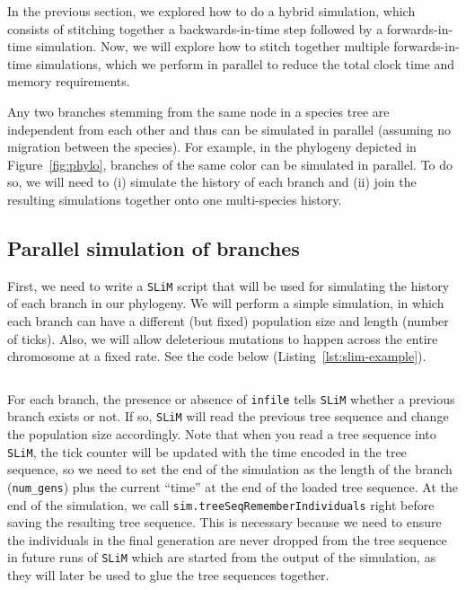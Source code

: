 \documentclass[12pt]{article}
\newcommand{\slim}[0]{\texttt{SLiM}\xspace}
\begin{document}
In the previous section, we explored how to do a hybrid simulation, which consists of stitching together a backwards-in-time step followed by a forwards-in-time simulation.
Now, we will explore how to stitch together multiple forwards-in-time simulations, which we perform in parallel to reduce the total clock time and memory requirements.

Any two branches stemming from the same node in a species tree are independent from each other and
thus can be simulated in parallel (assuming no migration between the species).
For example, in the phylogeny depicted in Figure~\ref{fig:phylo},
branches of the same color can be simulated in parallel.
To do so, we will need to
(i) simulate the history of each branch and
(ii) join the resulting simulations together onto one multi-species history.

\subsection{Parallel simulation of branches}

First, we need to write a \slim script that will be used for simulating the history of each branch in our phylogeny.
We will perform a simple simulation,
in which each branch can have a different (but fixed) population size and length (number of ticks).
Also, we will allow deleterious mutations to happen across the entire chromosome at a fixed rate.
See the code below (Listing~\ref{lst:slim-example}).

\begin{listing}[H]
  \inputminted[breaklines, breakautoindent=true, breakanywhere=true, fontsize=\small, linenos, bgcolor=gray!10]{javascript}{./code/parallelizing_phylogeny/simulate_branch.slim}
  \caption{Simple \slim script to simulate a constant size population that can be started from an existing tree sequence.}
  \label{lst:slim-example}
\end{listing}

For each branch, the presence or absence of \verb|infile| tells \slim whether a previous branch exists or not.
If so, \slim will read the previous tree sequence and change the population size accordingly.
Note that when you read a tree sequence into \slim,
the tick counter will be updated with the time encoded in the tree sequence,
so we need to set the end of the simulation as the length of the branch (\verb|num_gens|)
plus the current “time” at the end of the loaded tree sequence.
At the end of the simulation, we call \verb|sim.treeSeqRememberIndividuals| right before saving the resulting tree sequence.
This is necessary because we need to ensure the individuals in the final generation are never dropped
from the tree sequence in future runs of \slim which are started from the output of the simulation,
as they will later be used to glue the tree sequences together.
\end{document}
